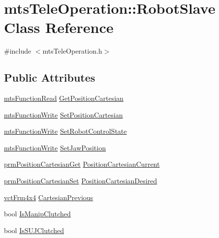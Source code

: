 \hypertarget{classmts_tele_operation_1_1_robot_slave}{\section{mts\-Tele\-Operation\-:\-:Robot\-Slave Class Reference}
\label{classmts_tele_operation_1_1_robot_slave}
}


{\ttfamily \#include $<$mts\-Tele\-Operation.\-h$>$}

\subsection*{Public Attributes}
\begin{DoxyCompactItemize}
\item 
\hyperlink{classmts_function_read}{mts\-Function\-Read} \hyperlink{classmts_tele_operation_1_1_robot_slave_a4e162dfa31d136f8f7f44fed8a069e6b}{Get\-Position\-Cartesian}
\item 
\hyperlink{classmts_function_write}{mts\-Function\-Write} \hyperlink{classmts_tele_operation_1_1_robot_slave_a1459465173fd01f73a99062b2fbba3f0}{Set\-Position\-Cartesian}
\item 
\hyperlink{classmts_function_write}{mts\-Function\-Write} \hyperlink{classmts_tele_operation_1_1_robot_slave_a7d66a6da265a36a7f88492030adb29af}{Set\-Robot\-Control\-State}
\item 
\hyperlink{classmts_function_write}{mts\-Function\-Write} \hyperlink{classmts_tele_operation_1_1_robot_slave_a017a1bdd14dd2a1f0b5550c1afe069c1}{Set\-Jaw\-Position}
\item 
\hyperlink{classprm_position_cartesian_get}{prm\-Position\-Cartesian\-Get} \hyperlink{classmts_tele_operation_1_1_robot_slave_a73c0eae30312661f3992f9d1b3a31c5a}{Position\-Cartesian\-Current}
\item 
\hyperlink{classprm_position_cartesian_set}{prm\-Position\-Cartesian\-Set} \hyperlink{classmts_tele_operation_1_1_robot_slave_ab79377bd91a457f5e32b86be683d2155}{Position\-Cartesian\-Desired}
\item 
\hyperlink{vct_transformation_types_8h_a33da47f4deb2556b37a69a2c44b29d75}{vct\-Frm4x4} \hyperlink{classmts_tele_operation_1_1_robot_slave_a677cbc91dd8a2e32697c3345f0ef91fb}{Cartesian\-Previous}
\item 
bool \hyperlink{classmts_tele_operation_1_1_robot_slave_a7ffcde3f970997668a8a7ad1e92af9f3}{Is\-Manip\-Clutched}
\item 
bool \hyperlink{classmts_tele_operation_1_1_robot_slave_a909bc3055303309163aca3d3b3f4b0e5}{Is\-S\-U\-J\-Clutched}
\end{DoxyCompactItemize}


